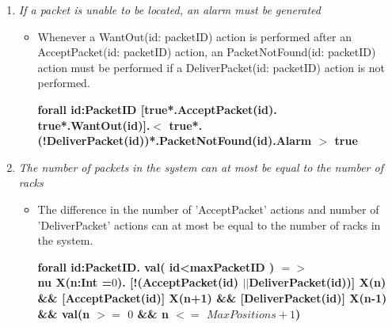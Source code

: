\begin{enumerate}
\begin{itemize}
	\textbf{forall id: PacketID.val(id $<$ maxPacketID) $=>$ $\\$ [(!AcceptPacket(id))*. AcceptPacket(id). (!(DeliverPacket(id)))*.\\ WantOut(id)] $<$(!DeliverPacket(id))*.DeliverPacket(id)$>$ true}
	
\end{itemize}

\item \textit{If a packet is unable to be located, an alarm must 
	be generated}
	\begin{itemize}	
	\item  Whenever a WantOut(id: packetID) action is performed after an 
	AcceptPacket(id: packetID) action, an PacketNotFound(id: packetID) action must be performed if a DeliverPacket(id: packetID) action is not performed.
	
	\textbf{forall id:PacketID [true*.AcceptPacket(id). \\ 
	true*.WantOut(id)].$<$ true*. 
	(!DeliverPacket(id))*.PacketNotFound(id).Alarm $>$ true	}
	
\end{itemize}

\item \textit{The number of packets in the system can at most be equal to the number of racks}
	\begin{itemize}
	\item The difference in the number of 'AcceptPacket'
	actions and number of 'DeliverPacket' actions can at most be 
	equal to the number of racks in the system.
	
\textbf{forall id:PacketID. val( id<maxPacketID ) $=>$ \\ nu X(n:Int =$0$). [!(AcceptPacket(id) $||$DeliverPacket(id))] X(n)\\ \&\& [AcceptPacket(id)] X(n+1) \&\& [DeliverPacket(id)] X(n-1)\\ \&\& val(n $>=$ $0$ \&\& n $<=$ $MaxPositions+1$)}	

	\end{itemize}
\end{enumerate}
